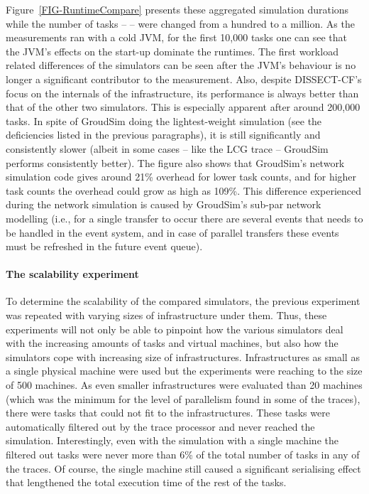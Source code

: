 \documentclass[sort, compress, 5p]{elsarticle}
\begin{document}
Figure~\ref{FIG-RuntimeCompare} presents these aggregated simulation durations while the number of tasks --  -- were changed from a hundred to a million. As the measurements ran with a cold JVM, for the first 10,000 tasks one can see that the JVM's effects on the start-up dominate the runtimes. The first workload related differences of the simulators can be seen after the JVM's behaviour is no longer a significant contributor to the measurement. Also, despite DISSECT-CF's focus on the internals of the infrastructure, its performance is always better than that of the other two simulators. This is especially apparent after around 200,000 tasks. In spite of GroudSim doing the lightest-weight simulation (see the deficiencies listed in the previous paragraphs), it is still significantly and consistently slower (albeit in some cases -- like the LCG trace -- GroudSim performs consistently better). The figure also shows that GroudSim's network simulation code gives around 21\% overhead for lower task counts, and for higher task counts the overhead could grow as high as 109\%. This difference experienced during the network simulation is caused by GroudSim's sub-par network modelling (i.e., for a single transfer to occur there are several events that needs to be handled in the event system, and in case of parallel transfers these events must be refreshed in the future event queue).

\paragraph{The scalability experiment}

To determine the scalability of the compared simulators, the previous experiment was repeated with varying sizes of infrastructure under them. Thus, these experiments will not only be able to pinpoint how the various simulators deal with the increasing amounts of tasks and virtual machines, but also how the simulators cope with increasing size of infrastructures. Infrastructures as small as a single physical machine were used but the experiments were reaching to the size of 500 machines. As even smaller infrastructures were evaluated than 20 machines (which was the minimum for the level of parallelism found in some of the traces), there were tasks that could not fit to the infrastructures. These tasks were automatically filtered out by the trace processor and never reached the simulation. Interestingly, even with the simulation with a single machine the filtered out tasks were never more than 6\% of the total number of tasks in any of the traces. Of course, the single machine still caused a significant serialising effect that lengthened the total execution time of the rest of the tasks.
\end{document}

